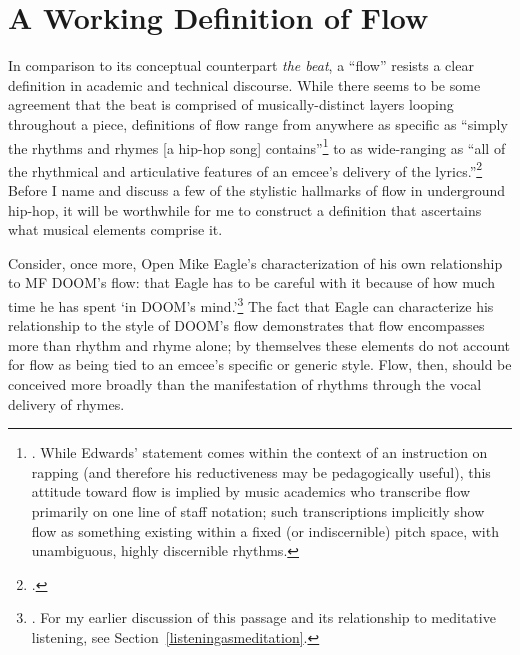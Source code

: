 \onehalfspacing
\label{chapter3}
\section{A Working Definition of Flow}

In comparison to its conceptual counterpart \emph{the beat}, a ``flow'' resists a clear 
definition in academic and technical discourse. While there seems to be some agreement
that the beat is comprised of musically-distinct layers looping throughout a piece, 
definitions of flow range from anywhere as specific as ``simply the rhythms and rhymes
[a hip-hop song] contains''\footnote{
    \autocite[63]{pauledwardsHowRapArt2009}. While Edwards' statement comes within the 
    context of an instruction on rapping (and therefore his reductiveness may be 
    pedagogically useful), this attitude toward flow is implied by music academics who 
    transcribe flow primarily on one line of staff notation; such transcriptions implicitly
    show flow as something existing within a fixed (or indiscernible) pitch space, with 
    unambiguous, highly discernible rhythms.} 
to as wide-ranging as ``all of the rhythmical and articulative features of an emcee's 
delivery of the lyrics.''\footnote{
    \cite{kyleadamsMetricalTechniquesFlow2009}.} 
Before I name and discuss a few of the stylistic hallmarks of flow in underground hip-hop,
it will be worthwhile for me to construct a definition that ascertains what musical elements
comprise it.

Consider, once more, Open Mike Eagle's characterization of his own relationship to MF 
DOOM's flow: that Eagle has to be careful with it because of how much time he has spent
`in DOOM's mind.'\footnote{
    \cite{estellecaswellRappingDeconstructedBest2016}. For my earlier discussion of this
    passage and its relationship to meditative listening,  see Section~\ref{listeningasmeditation}.} 
The fact that Eagle can characterize his relationship to the style of DOOM's flow demonstrates
that flow encompasses more than rhythm and rhyme alone; by themselves these elements do not
account for flow as being tied to an emcee's specific or generic style. Flow, then, should
be conceived more broadly than the manifestation of rhythms through the vocal delivery of
rhymes.

